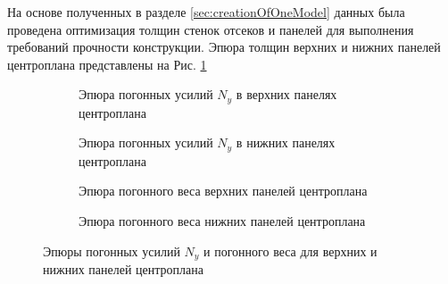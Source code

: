 На основе полученных в разделе \ref{sec:creationOfOneModel} данных была проведена оптимизация толщин стенок отсеков и панелей для выполнения требований прочности конструкции. Эпюра толщин верхних и нижних панелей центроплана представлены на Рис. \ref{fig:epures}

\begin{figure}[H]
\centering
\captionsetup{justification=centering}
\begin{subfigure}[b]{0.49\textwidth}
	\centering
	\def\svgwidth{\textwidth}
	
	
	\caption{Эпюра погонных усилий $N_y$ в верхних панелях центроплана}
\end{subfigure}
\begin{subfigure}[b]{0.49\textwidth}
	\centering
	\def\svgwidth{\textwidth}
	
	\caption{Эпюра погонных усилий $N_y$ в нижних панелях центроплана}
\end{subfigure}
\begin{subfigure}[b]{0.49\textwidth}
	\centering
	\def\svgwidth{\textwidth}
	
	\caption{Эпюра погонного веса верхних панелей центроплана}
\end{subfigure}
\begin{subfigure}[b]{0.49\textwidth}
	\centering
	\def\svgwidth{\textwidth}		
	\caption{Эпюра погонного веса нижних панелей центроплана}
\end{subfigure}
	\label{fig:epures}
	\caption{Эпюры погонных усилий $N_y$ и погонного веса для верхних и нижних панелей центроплана}
\end{figure}
%
%
%	
%
%	
%
%	





